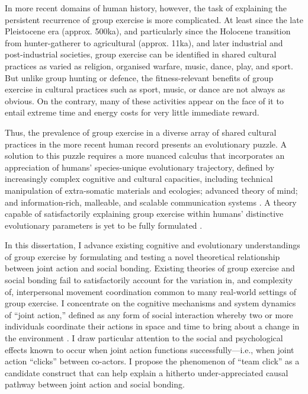 \begin{CJK}{UTF8}{gbsn}
In more recent domains of human history, however, the task of explaining the persistent recurrence of group exercise is more complicated.  At least since the late Pleistocene era (approx. 500ka), and particularly since the Holocene transition from hunter-gatherer to agricultural (approx. 11ka), and later industrial and post-industrial societies, group exercise can be identified in shared cultural practices as varied as religion, organised warfare, music, dance, play, and sport.  But unlike group hunting or defence, the fitness-relevant benefits of group exercise in cultural practices such as sport, music, or dance are not always as obvious.  On the contrary, many of these activities appear on the face of it to entail extreme time and energy costs for very little immediate reward.

Thus, the prevalence of group exercise in a diverse array of shared cultural practices in the more recent human record presents an evolutionary puzzle.  A solution to this puzzle requires a more nuanced calculus that incorporates an appreciation of humans' species-unique evolutionary trajectory, defined by increasingly complex cognitive and cultural capacities, including technical manipulation of extra-somatic materials and ecologies; advanced theory of mind; and information-rich, malleable, and scalable communication systems \citep{Roepstorff2010,Clark2015,Fuentes2016}.  A theory capable of satisfactorily explaining group exercise within humans' distinctive evolutionary parameters is yet to be fully formulated \citep{Cohen2017}.

In this dissertation, I advance existing cognitive and evolutionary understandings of group exercise by formulating and testing a novel theoretical relationship between joint action and social bonding.  Existing theories of group exercise and social bonding fail to satisfactorily account for the variation in, and complexity of, interpersonal movement coordination common to many real-world settings of group exercise.  I concentrate on the cognitive mechanisms and system dynamics of ``joint action,'' defined as any form of social interaction whereby two or more individuals coordinate their actions in space and time to bring about a change in the environment \citep{Sebanz2006}. I draw particular attention to the social and psychological effects known to occur when joint action functions successfully---i.e., when joint action ``clicks'' between co-actors.  I propose the phenomenon of ``team click'' as a candidate construct that can help explain a hitherto under-appreciated causal pathway between joint action and social bonding.


\end{CJK}
